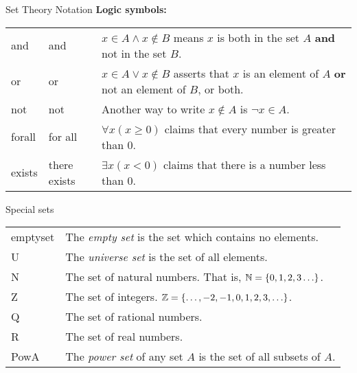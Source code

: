 \documentclass[12pt]{article}
\begin{document}
\begin{defbox}{Set Theory Notation}
\noindent\textbf{Logic symbols:}\\
\noindent  \begin{tabular}{p{.65in} p{1.35in} p{3.1in}}

    \gls{and} & and & $x \in A \wedge x \notin B$ means $x$ is both in the set $A$ \textbf{and} not in the set $B$. \\[.5ex]
    \gls{or} & or & $x \in A \vee x \notin B$ asserts that $x$ is an element of $A$ \textbf{or} not an element of $B$, or both. \\[.5ex]
    \gls{not} & not & Another way to write $x \notin A$ is $\neg x \in A$.\\[.5ex]
    \gls{forall} & for all & $\forall x (x \ge 0)$ claims that every number is greater than 0.\index{universal quantifier} \\[.5ex]
    \gls{exists} & there exists\index{existential quantifier} & $\exists x (x < 0)$ claims that there is a number less than 0.
  \end{tabular}

\end{defbox}

\begin{defbox}{Special sets}

\begin{tabular}{l p{4.75in}}
  \gls{emptyset} & The \emph{empty set}\index{empty set} is the set which contains no elements.\\[1ex]
  \gls{U} & The \emph{universe set} is the set of all elements.\\[1ex]
\gls{N} & The set of natural numbers\index{natural numbers}. That is, $\mathbb N = \{0, 1, 2, 3\ldots\}$. \\[1ex]
\gls{Z} & The set of integers\index{integers}.  $\mathbb Z = \{\ldots, -2, -1, 0, 1, 2, 3, \ldots\}$.\\[1ex]
\gls{Q} & The set of rational numbers\index{rationals}.\\[1ex]
\gls{R} & The set of real numbers\index{reals}.\\[1ex]
\gls{PowA} & The \emph{power set}\index{power set} of any set $A$ is the set of all subsets of $A$.
\end{tabular}
\end{defbox}
\end{document}
